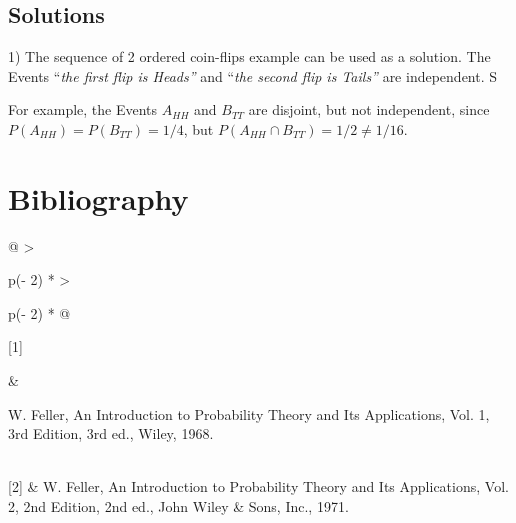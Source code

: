 \subsection{Solutions}\label{solutions}

1) The sequence of 2 ordered coin-flips example can be used as a
solution. The Events ``\emph{the first flip is Heads''} and ``\emph{the
second flip is Tails''} are independent. S

For example, the Events \(A_{HH}\) and \(B_{TT}\) are disjoint, but not
independent, since
\(P\left( A_{HH} \right) = P\left( B_{TT} \right) = 1/4\), but
\(P\left( A_{HH} \cap B_{TT} \right) = 1/2 \neq 1/16\).

\section{Bibliography}\label{bibliography}

\begin{longtable}[]{@{}
  >{\raggedright\arraybackslash}p{(\columnwidth - 2\tabcolsep) * }
  >{\raggedright\arraybackslash}p{(\columnwidth - 2\tabcolsep) * }@{}}
\toprule\noalign{}
\begin{minipage}[b]{\linewidth}\raggedright
{[}1{]}
\end{minipage} & \begin{minipage}[b]{\linewidth}\raggedright
W. Feller, An Introduction to Probability Theory and Its Applications,
Vol. 1, 3rd Edition, 3rd ed., Wiley, 1968.
\end{minipage} \\
\midrule\noalign{}
\endhead
\bottomrule\noalign{}
\endlastfoot
{[}2{]} & W. Feller, An Introduction to Probability Theory and Its
Applications, Vol. 2, 2nd Edition, 2nd ed., John Wiley \& Sons, Inc.,
1971. \\
\end{longtable}
